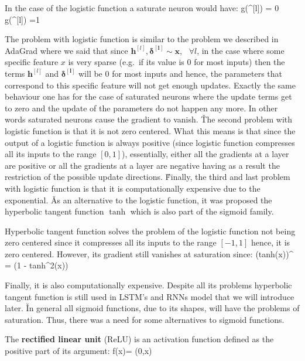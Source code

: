 In the case of the logistic function a saturate neuron would have:
\bse
g({}^{[l]}) = 0 \quad {} \quad g({}^{[l]}) =1
\ese

The problem with logistic function is similar to the problem we described in AdaGrad where we said that since 
${\boldsymbol{h}^{[l]}}, \boldsymbol{\delta^{[l]}} \sim \boldsymbol{x}, \:\:\: \forall l$, in the case where some 
specific feature $x$ is very sparse (e.g.\ if its value is 0 for most inputs) then the terms ${\boldsymbol{h}^{[l]}}$
and $\boldsymbol{\delta^{[l]}}$ will be 0 for most inputs and hence, the parameters that correspond to this specific
feature will not get enough updates. Exactly the same behaviour one has for the case of saturated neurons where the 
update terms get to zero and the update of the parameters do not happen any more. In other words saturated neurons 
cause the gradient to vanish. \v

The second problem with logistic function is that it is not zero centered. What this means is that since the output 
of a logistic function is always positive (since logistic function compresses all its inputs to the range $[0,1]$), 
essentially, either all the gradients at a layer are positive or all the gradients at a layer are negative having as 
a result the restriction of the possible update directions. \v

Finally, the third and last problem with logistic function is that it is computationally expensive due to the
exponential. \v

As an alternative to the logistic function, it was proposed the hyperbolic tangent function $\tanh$ which is also 
part of the sigmoid family.


Hyperbolic tangent function solves the problem of the logistic function not being zero centered since it compresses 
all its inputs to the range $[-1,1]$ hence, it is zero centered. However, its gradient still vanishes at saturation
since:
\bse
(tanh(x))^{\prime} = (1 - tanh^{2}(x))
\ese

Finally, it is also computationally expensive. Despite all its problems hyperbolic tangent function is still used in
LSTM's and RNNs model that we will introduce later. \v

In general all sigmoid functions, due to its shapes, will have the problems of saturation. Thus, there was a need for
some alternatives to sigmoid functions.

The \textbf{rectified linear unit }(ReLU) is an activation function defined as the positive part of its argument:
\bse
f(x)= \max(0,x)
\ese

